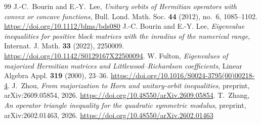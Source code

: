 \documentclass[10pt,a4paper]{amsart}
\numberwithin{equation}{section}
\begin{document}
\begin{thebibliography}{99}
 J.-C.~Bourin and E.-Y.~Lee, \emph{Unitary orbits of Hermitian operators with convex or concave functions}, Bull. Lond. Math. Soc. \textbf{44} (2012), no.~6, 1085--1102. \url{https://doi.org/10.1112/blms/bds080}
 J.-C. Bourin and E.-Y. Lee, \emph{Eigenvalue inequalities for positive block matrices with the inradius of the numerical range}, Internat. J. Math. \textbf{33} (2022), 2250009. \url{https://doi.org/10.1142/S0129167X22500094}.
 W. Fulton, \emph{Eigenvalues of majorized Hermitian matrices and Littlewood--Richardson coefficients}, Linear Algebra Appl. \textbf{319} (2000), 23--36. \url{https://doi.org/10.1016/S0024-3795(00)00218-4}.
 J.~Zhou, \emph{From majorization to Horn and unitary-orbit inequalities}, preprint, arXiv:2609.05854, 2026. \url{https://doi.org/10.48550/arXiv.2609.05854}.
 T.~Zhang, \emph{An operator triangle inequality for the quadratic symmetric modulus}, preprint, arXiv:2602.01463, 2026. \url{https://doi.org/10.48550/arXiv.2602.01463}
\end{thebibliography}
\end{document}
